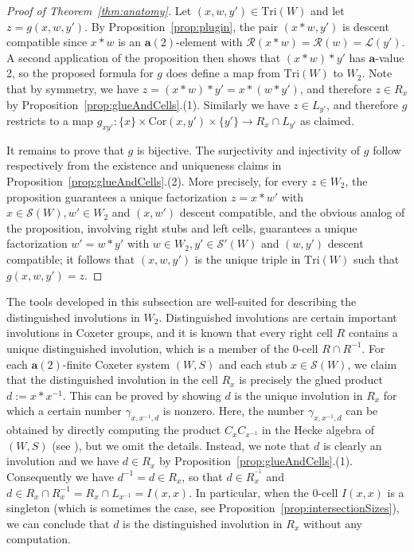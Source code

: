 \documentclass[ALCO,Unicode,published]{cedram}
\newcommand{\call}{\mathcal{L}}
\newcommand{\calr}{\mathcal{R}}
\newcommand{\cals}{\mathcal{S}}
\newcommand{\la}{\mathbf{a}}
\newcommand{\sw}{\mathcal{S}(W)}
\newcommand{\triples}{\mathrm{Tri}(W) }
\newcommand{\cores}{\mathrm{Cor}}
\newcommand{\ra}{\rightarrow}
\newcommand{\inverse}{^{-1}}
\begin{document}
\begin{proof}[Proof of Theorem~\ref{thm:anatomy}]
    Let $(x,w,y')\in \triples$ and let $z=g(x,w,y')$. By Proposition~\ref{prop:plugin}, the pair $(x*w,y')$ is
    descent compatible since $x*w$ is an $\la(2)$-element with $\calr(x*w)=\calr(w)=\call(y')$. A
    second application of the proposition then shows that $(x*w)*y'$ has $\la$-value 2, so the
    proposed formula for $g$ does define a map from $\triples$ to $W_2$. Note that by symmetry, we
    have $z=(x*w)*y'=x*(w*y')$, and therefore $z\in R_x$ by Proposition~\ref{prop:glueAndCells}.(1). Similarly
    we have $z\in L_{y'}$, and therefore $g$ restricts to a map
    $g_{xy'}:\{x\}\times\cores(x,y')\times \{y'\}\ra R_x\cap L_{y'}$ as claimed. 

    It remains to prove that $g$ is bijective. The surjectivity and injectivity of $g$ follow
    respectively from the existence and uniqueness claims in Proposition~\ref{prop:glueAndCells}.(2). More
    precisely, for every $z\in W_2$, the proposition guarantees a unique factorization $z=x* w'$
    with $x\in\sw, w'\in W_2$ and $(x,w')$ descent compatible, and the obvious analog of the
    proposition, involving right stubs and left cells, guarantees a unique factorization $w'=w*y'$
    with $w\in W_2, y'\in \cals'(W)$ and $(w,y')$ descent compatible; it follows that $(x,w,y')$ is
    the unique triple in $\triples$ such that $g(x,w,y')=z$.
\end{proof}

\begin{remark}
    \label{rmk:distinguishedInvolutions}
    The tools developed in this subsection are well-suited for describing the distinguished
    involutions in $W_2$.  Distinguished involutions are certain important involutions in Coxeter
    groups, and it is known that every right cell $R$ contains a unique distinguished involution,
    which is a member of the 0-cell $R\cap R\inverse$. For each $\la(2)$-finite Coxeter system
    $(W,S)$ and each stub $x\in \sw$, we claim that the distinguished involution in the cell $R_x$
    is precisely the glued product $d:=x*x^{-1}$. This can be proved by showing $d$ is the unique
    involution in $R_x$ for which a certain number $\gamma_{x,x\inverse, d}$ is nonzero. Here, the
    number $\gamma_{x,x\inverse,d}$ can be obtained by directly computing the product
    $C_{x}C_{x\inverse}$ in the Hecke algebra of $(W,S)$ (see \cite[\S 14]{LusztigHecke}), but we
    omit the details. Instead, we note that $d$ is clearly an involution and we have $d\in R_x$ by
    Proposition~\ref{prop:glueAndCells}.(1). Consequently we have $d\inverse=d\in R_x$, so that $d\in
    R_x^{\inverse}$ and $d\in R_x\cap R_{x}\inverse=R_x\cap L_{x\inverse}=I(x,x)$. In particular,
    when the 0-cell $I(x,x)$ is a singleton (which is sometimes the case, see
    Proposition~\ref{prop:intersectionSizes}), we can conclude that $d$ is the distinguished involution in
    $R_x$ without any computation.
\end{remark}
\end{document}
